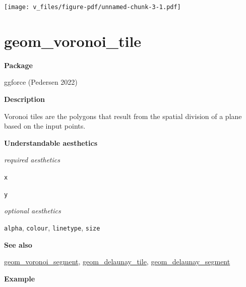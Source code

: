 \documentclass[
  letterpaper,
  DIV=11,
  numbers=noendperiod]{scrreprt}
\begin{document}
\texttt{[image: v\_files/figure-pdf/unnamed-chunk-3-1.pdf]}

\section{geom\_voronoi\_tile}\label{geom_voronoi_tile}

\textbf{Package}

ggforce (Pedersen 2022)

\textbf{Description}

Voronoi tiles are the polygons that result from the spatial division of
a plane based on the input points.

\textbf{Understandable aesthetics}

\emph{required aesthetics}

\texttt{x}

\texttt{y}

\emph{optional aesthetics}

\texttt{alpha}, \texttt{colour}, \texttt{linetype}, \texttt{size}

\textbf{See also}

\hyperref[voroni_segment]{geom\_voronoi\_segment},
\hyperref[delaunay_tile]{geom\_delaunay\_tile},
\hyperref[delaunay_segment]{geom\_delaunay\_segment}

\textbf{Example}
\end{document}
